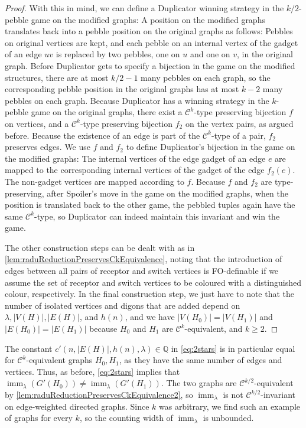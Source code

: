 \documentclass[10pt,a4paper]{article}
\theoremstyle{definition}
\theoremstyle{plain}
\theoremstyle{remark}
\newcommand{\bbQ}{\mathbb{Q}}
\DeclareMathOperator{\imm}{imm}
\begin{document}
\begin{proof}
With this in mind, we can define a Duplicator winning strategy in the $k/2$-pebble game on the modified graphs: A position on the modified graphs translates back into a pebble position on the original graphs as follows: Pebbles on original vertices are kept, and each pebble on an internal vertex of the gadget of an edge $uv$ is replaced by two pebbles, one on $u$ and one on $v$, in the original graph. Before Duplicator gets to specify a bijection in the game on the modified structures, there are at most $k/2-1$ many pebbles on each graph, so the corresponding pebble position in the original graphs has at most $k-2$ many pebbles on each graph. Because Duplicator has a winning strategy in the $k$-pebble game on the original graphs, there exist a $\mathcal{C}^k$-type preserving bijection $f$ on vertices, and a $\mathcal{C}^k$-type preserving bijection $f_2$ on the vertex pairs, as argued before. Because the existence of an edge is part of the $\mathcal{C}^k$-type of a pair, $f_2$ preserves edges. We use $f$ and $f_2$ to define Duplicator's bijection in the game on the modified graphs: The internal vertices of the edge gadget of an edge $e$ are mapped to the corresponding internal vertices of the gadget of the edge $f_2(e)$. The non-gadget vertices are mapped according to $f$. Because $f$ and $f_2$ are type-preserving, after Spoiler's move in the game on the modified graphs, when the position is translated back to the other game, the pebbled tuples again have the same $\mathcal{C}^k$-type, so Duplicator can indeed maintain this invariant and win the game.

The other construction steps can be dealt with as in \cref{lem:raduReductionPreservesCkEquivalence}, noting that the introduction of edges between all pairs of receptor and switch vertices is FO-definable if we assume the set of receptor and switch vertices to be coloured with a distinguished colour, respectively. 
In the final construction step, we just have to note that the number of isolated vertices and digons that are added depend on $\lambda, |V(H)|, |E(H)|$, and $h(n)$, and we have $|V(H_0)| = |V(H_1)|$ and $|E(H_0)| = |E(H_1)|$ because $H_0$ and $H_1$ are $\mathcal{C}^k$-equivalent, and $k \geq 2$.
\end{proof}	
The constant $c'(n, |E(H)|, h(n), \lambda) \in \bbQ$ in \cref{eq:2stars} is in particular equal for $\mathcal{C}^k$-equivalent graphs $H_0, H_1$, as they have the same number of edges and vertices.
Thus, as before, \cref{eq:2stars} implies that $\imm_{\lambda}(G'(H_0)) \neq \imm_{\lambda}(G'(H_1))$. The two graphs are $\mathcal{C}^{k/2}$-equivalent by \cref{lem:raduReductionPreservesCkEquivalence2}, so $\imm_{\lambda}$ is not $\mathcal{C}^{k/2}$-invariant on edge-weighted directed graphs. Since $k$ was arbitrary, we find such an example of graphs for every $k$, so the counting width of $\imm_{\lambda}$ is unbounded.
\end{document}
